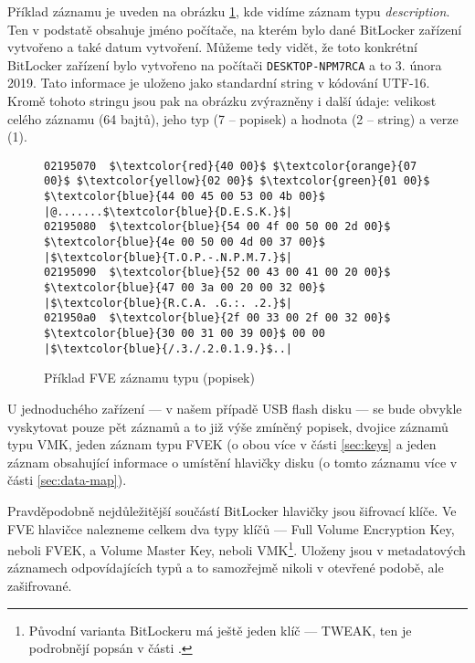 
Příklad  záznamu je uveden na obrázku \ref{fig:fve-entry-desc}, kde vidíme záznam typu \emph{description}. Ten v podstatě obsahuje jméno počítače, na kterém bylo dané BitLocker zařízení vytvořeno a také datum vytvoření. Můžeme tedy vidět, že toto konkrétní BitLocker zařízení bylo vytvořeno na počítači \texttt{DESKTOP-NPM7RCA} a to 3. února 2019. Tato informace je uloženo jako standardní string v kódování UTF-16. Kromě tohoto stringu jsou pak na obrázku zvýrazněny i další údaje: velikost celého záznamu (64 bajtů), jeho typ (7 -- popisek) a hodnota (2 -- string) a verze (1).


\begin{figure}[h]
		\centering
		\captionsetup{width=0.65\linewidth}
		\caption{Příklad FVE záznamu typu  (popisek)}
		\label{fig:fve-entry-desc}

\begin{lstlisting}[frame=none, escapechar=$, basicstyle=\ttfamily\small, columns=fullflexible, keepspaces=true]
02195070  $\textcolor{red}{40 00}$ $\textcolor{orange}{07 00}$ $\textcolor{yellow}{02 00}$ $\textcolor{green}{01 00}$  $\textcolor{blue}{44 00 45 00 53 00 4b 00}$ |@.......$\textcolor{blue}{D.E.S.K.}$|
02195080  $\textcolor{blue}{54 00 4f 00 50 00 2d 00}$  $\textcolor{blue}{4e 00 50 00 4d 00 37 00}$ |$\textcolor{blue}{T.O.P.-.N.P.M.7.}$|
02195090  $\textcolor{blue}{52 00 43 00 41 00 20 00}$  $\textcolor{blue}{47 00 3a 00 20 00 32 00}$ |$\textcolor{blue}{R.C.A. .G.:. .2.}$|
021950a0  $\textcolor{blue}{2f 00 33 00 2f 00 32 00}$  $\textcolor{blue}{30 00 31 00 39 00}$ 00 00 |$\textcolor{blue}{/.3./.2.0.1.9.}$..|
\end{lstlisting}

\end{figure}

U jednoduchého zařízení --- v našem případě USB flash disku --- se bude obvykle vyskytovat pouze pět záznamů a to již výše zmíněný popisek, dvojice záznamů typu VMK, jeden záznam typu FVEK (o obou více v části \ref{sec:keys} a jeden záznam obsahující informace o umístění hlavičky disku (o tomto záznamu více v části \ref{sec:data-map}).

\label{sec:keys}

Pravděpodobně nejdůležitější součástí BitLocker hlavičky jsou šifrovací klíče. Ve FVE hlavičce nalezneme celkem dva typy klíčů --- Full Volume Encryption Key, neboli FVEK, a Volume Master Key, neboli VMK\footnote{Původní varianta BitLockeru má ještě jeden klíč --- TWEAK, ten je podrobnějí popsán v části .}. Uloženy jsou v metadatových záznamech odpovídajících typů a to samozřejmě nikoli v otevřené podobě, ale zašifrované.

